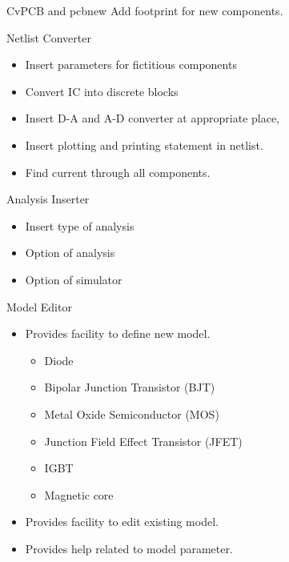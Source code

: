 \documentclass{beamer}
\begin{document}
\begin{frame}
\begin{block}{ CvPCB and pcbnew}
Add footprint for new components.
\end{block}
\end{frame}

\begin{frame}
\begin{block}{Netlist Converter}
\begin{itemize}
\item Insert parameters for fictitious components
\item Convert IC into discrete blocks
\item Insert D-A and A-D converter at appropriate place,
\item Insert plotting and printing statement in netlist.
\item Find current through all components.  
\end{itemize}
\end{block}
\end{frame}

\begin{frame}
\begin{block}{Analysis Inserter}
\begin{itemize}
\item Insert type of analysis
\item Option of analysis
\item Option of simulator
\end{itemize}
\end{block}
\end{frame}

\begin{frame}
  \begin{block}{Model Editor}
    \begin{itemize}
            \item Provides facility to define new model.
    \begin{itemize}
            \item Diode
            \item Bipolar Junction Transistor (BJT)
            \item Metal Oxide Semiconductor (MOS)
            \item Junction Field Effect Transistor (JFET)
            \item IGBT
            \item Magnetic core
    \end{itemize}
            \item Provides facility to edit existing model.
            \item Provides help related to model parameter.
    \end{itemize}
  \end{block}
\end{frame}
\end{document}
